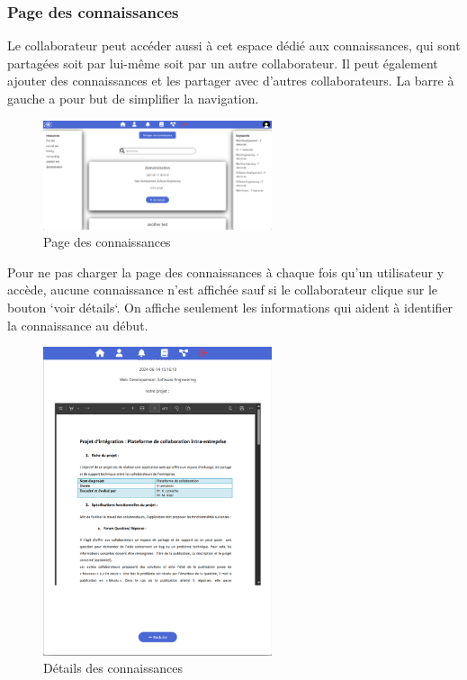 \documentclass{article}
\begin{document}
            \subsubsection{Page des connaissances}
                Le collaborateur peut accéder aussi à cet espace dédié aux connaissances, qui sont partagées soit par lui-même soit par un autre collaborateur. Il peut également ajouter des connaissances et les partager avec d'autres collaborateurs. La barre à gauche a pour but de simplifier la navigation.
                \begin{figure}[h!]
                    \centering
                    \includegraphics[width=0.6\textwidth]{assets/webSite/base-de-connaissance.png}
                    \caption{Page des connaissances}
                \end{figure}
                \FloatBarrier
                Pour ne pas charger la page des connaissances à chaque fois qu'un utilisateur y accède, aucune connaissance n'est affichée sauf si le collaborateur clique sur le bouton `voir détails`. On affiche seulement les informations qui aident à identifier la connaissance au début.
                \begin{figure}[h!]
                    \centering
                    \includegraphics[width=0.6\textwidth]{assets/webSite/base-de-connaissance_demo.png}
                    \caption{Détails des connaissances}
                \end{figure}
                \FloatBarrier
                \newpage
\end{document}
